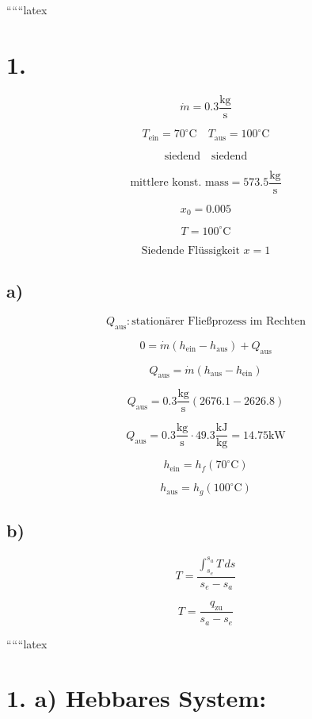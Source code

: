 
``````latex


\section*{1.}

\[
\dot{m} = 0.3 \frac{\text{kg}}{\text{s}}
\]

\[
T_{\text{ein}} = 70^\circ \text{C} \quad T_{\text{aus}} = 100^\circ \text{C}
\]

\[
\text{siedend} \quad \text{siedend}
\]

\[
\text{mittlere konst. mass} = 573.5 \frac{\text{kg}}{\text{s}}
\]

\[
x_0 = 0.005
\]

\[
T = 100^\circ \text{C}
\]

\[
\text{Siedende Flüssigkeit } x = 1
\]

\subsection*{a)}

\[
Q_{\text{aus}}: \text{stationärer Fließprozess im Rechten}
\]

\[
0 = \dot{m} (h_{\text{ein}} - h_{\text{aus}}) + Q_{\text{aus}}
\]

\[
Q_{\text{aus}} = \dot{m} (h_{\text{aus}} - h_{\text{ein}})
\]

\[
Q_{\text{aus}} = 0.3 \frac{\text{kg}}{\text{s}} (2676.1 - 2626.8)
\]

\[
Q_{\text{aus}} = 0.3 \frac{\text{kg}}{\text{s}} \cdot 49.3 \frac{\text{kJ}}{\text{kg}} = 14.75 \text{kW}
\]

\[
h_{\text{ein}} = h_f (70^\circ \text{C})
\]

\[
h_{\text{aus}} = h_g (100^\circ \text{C})
\]

\subsection*{b)}

\[
T = \frac{\int_{s_e}^{s_a} T \, ds}{s_e - s_a}
\]

\[
T = \frac{q_{\text{zu}}}{s_a - s_e}
\]

``````latex


\section*{1. a) Hebbares System:}

